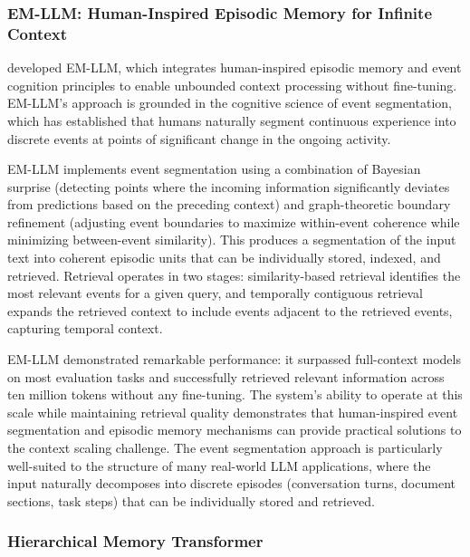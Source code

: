 \subsubsection{EM-LLM: Human-Inspired Episodic Memory for Infinite Context}

\citet{hu2025emllm} developed EM-LLM, which integrates human-inspired episodic memory and event cognition principles to enable unbounded context processing without fine-tuning. EM-LLM's approach is grounded in the cognitive science of event segmentation, which has established that humans naturally segment continuous experience into discrete events at points of significant change in the ongoing activity.

EM-LLM implements event segmentation using a combination of Bayesian surprise (detecting points where the incoming information significantly deviates from predictions based on the preceding context) and graph-theoretic boundary refinement (adjusting event boundaries to maximize within-event coherence while minimizing between-event similarity). This produces a segmentation of the input text into coherent episodic units that can be individually stored, indexed, and retrieved. Retrieval operates in two stages: similarity-based retrieval identifies the most relevant events for a given query, and temporally contiguous retrieval expands the retrieved context to include events adjacent to the retrieved events, capturing temporal context.

EM-LLM demonstrated remarkable performance: it surpassed full-context models on most evaluation tasks and successfully retrieved relevant information across ten million tokens without any fine-tuning. The system's ability to operate at this scale while maintaining retrieval quality demonstrates that human-inspired event segmentation and episodic memory mechanisms can provide practical solutions to the context scaling challenge. The event segmentation approach is particularly well-suited to the structure of many real-world LLM applications, where the input naturally decomposes into discrete episodes (conversation turns, document sections, task steps) that can be individually stored and retrieved.

\subsubsection{Hierarchical Memory Transformer}


